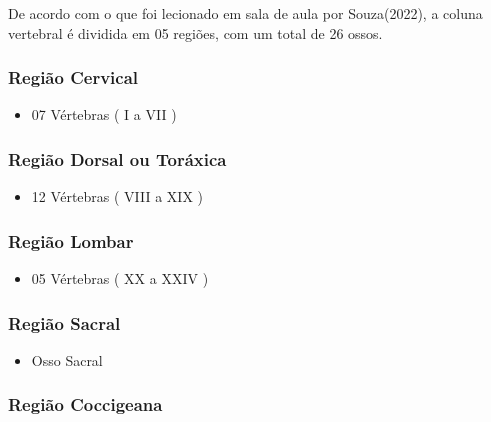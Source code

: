 \documentclass[
]{book}
\providecommand{\tightlist}{%
  \setlength{\itemsep}{0pt}\setlength{\parskip}{0pt}}
\begin{document}
De acordo com o que foi lecionado em sala de aula por Souza(2022), a coluna vertebral é dividida em 05 regiões, com um total de 26 ossos.

\hypertarget{regiuxe3o-cervical}{%
\subsubsection{Região Cervical}\label{regiuxe3o-cervical}}

\begin{itemize}
\tightlist
\item
  07 Vértebras ( I a VII )
\end{itemize}

\hypertarget{regiuxe3o-dorsal-ou-toruxe1xica}{%
\subsubsection{Região Dorsal ou Toráxica}\label{regiuxe3o-dorsal-ou-toruxe1xica}}

\begin{itemize}
\tightlist
\item
  12 Vértebras ( VIII a XIX )
\end{itemize}

\hypertarget{regiuxe3o-lombar}{%
\subsubsection{Região Lombar}\label{regiuxe3o-lombar}}

\begin{itemize}
\tightlist
\item
  05 Vértebras ( XX a XXIV )
\end{itemize}

\hypertarget{regiuxe3o-sacral}{%
\subsubsection{Região Sacral}\label{regiuxe3o-sacral}}

\begin{itemize}
\tightlist
\item
  Osso Sacral
\end{itemize}

\hypertarget{regiuxe3o-coccigeana}{%
\subsubsection{Região Coccigeana}\label{regiuxe3o-coccigeana}}
\end{document}
